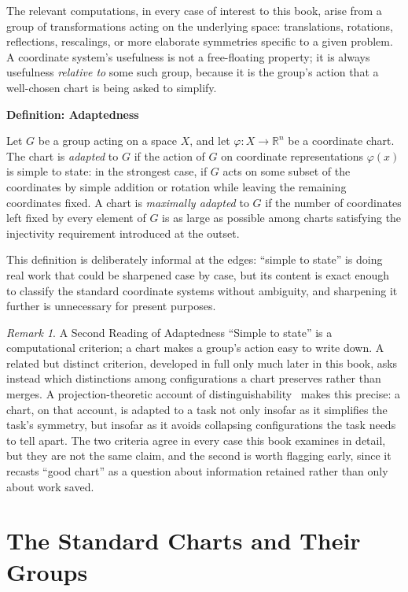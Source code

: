 \documentclass[11pt,fleqn]{book}
\numberwithin{equation}{chapter}
\newenvironment{definition}[1]
  {\begin{definitionEnv}
   \noindent\textbf{Definition: #1}\par\smallskip}
  {\end{definitionEnv}}
\theoremstyle{plain}
\theoremstyle{definition}
\theoremstyle{remark}
\newtheorem{remark}[theorem]{Remark}
\newcommand{\R}{\mathbb{R}}
\providecommand{\enquote}[1]{``#1''}
\begin{document}
The relevant computations, in every case of interest to this book, arise from a group of transformations acting on the underlying space: translations, rotations, reflections, rescalings, or more elaborate symmetries specific to a given problem. A coordinate system's usefulness is not a free-floating property; it is always usefulness \emph{relative to} some such group, because it is the group's action that a well-chosen chart is being asked to simplify.

\begin{definition}{Adaptedness}
Let \(G\) be a group acting on a space \(X\), and let \(\varphi:X\to\R^n\) be a coordinate chart. The chart is \emph{adapted} to \(G\) if the action of \(G\) on coordinate representations \(\varphi(x)\) is simple to state: in the strongest case, if \(G\) acts on some subset of the coordinates by simple addition or rotation while leaving the remaining coordinates fixed. A chart is \emph{maximally adapted} to \(G\) if the number of coordinates left fixed by every element of \(G\) is as large as possible among charts satisfying the injectivity requirement introduced at the outset.
\end{definition}

This definition is deliberately informal at the edges: \enquote{simple to state} is doing real work that could be sharpened case by case, but its content is exact enough to classify the standard coordinate systems without ambiguity, and sharpening it further is unnecessary for present purposes.

\begin{remark}{A Second Reading of Adaptedness}
\enquote{Simple to state} is a computational criterion; a chart makes a group's action easy to write down. A related but distinct criterion, developed in full only much later in this book, asks instead which distinctions among configurations a chart preserves rather than merges. A projection-theoretic account of distinguishability~\cite{distinction-geometry} makes this precise: a chart, on that account, is adapted to a task not only insofar as it simplifies the task's symmetry, but insofar as it avoids collapsing configurations the task needs to tell apart. The two criteria agree in every case this book examines in detail, but they are not the same claim, and the second is worth flagging early, since it recasts \enquote{good chart} as a question about information retained rather than only about work saved.
\end{remark}

\section{The Standard Charts and Their Groups}
\end{document}
